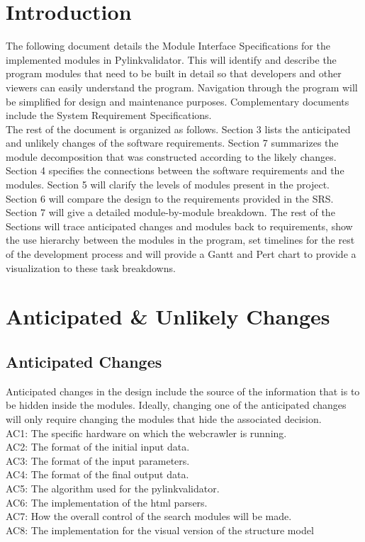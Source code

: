 \documentclass[titlepage]{article}
\begin{document}
\section{Introduction}
The following document details the Module Interface Specifications for the implemented modules in Pylinkvalidator. This will identify and describe the program modules that need to be built in detail so that developers and other viewers can easily understand the program.  Navigation through the program will be simplified for design and maintenance purposes. Complementary documents include the System Requirement Specifications.\\

The rest of the document is organized as follows. Section 3 lists the anticipated and unlikely changes of the software requirements. Section 7 summarizes the module decomposition that was constructed according to the likely changes. Section 4 specifies the connections between the software requirements and the modules. Section 5 will clarify the levels of modules present in the project. Section 6 will compare the design to the requirements provided in the SRS. Section 7 will give a detailed module-by-module breakdown. The rest of the Sections  will trace anticipated changes and modules back to requirements, show the use hierarchy between the modules in the program, set timelines for the rest of the development process and will provide a Gantt and Pert chart to provide a visualization to these task breakdowns.


\section{Anticipated \& Unlikely Changes}
\subsection{Anticipated Changes}
Anticipated changes in the design include the source of the information that is to be hidden inside the modules. Ideally, changing one of the anticipated changes will only require changing the modules that hide the associated decision.\\

\noindent
AC1: The specific hardware on which the webcrawler is running.\\
AC2: The format of the initial input data.\\
AC3: The format of the input parameters.\\
AC4: The format of the final output data.\\
AC5: The algorithm used for the pylinkvalidator.\\
AC6: The implementation of the html parsers.\\
AC7: How the overall control of the search modules will be made.\\
AC8: The implementation for the visual version of the structure model\\
\end{document}
